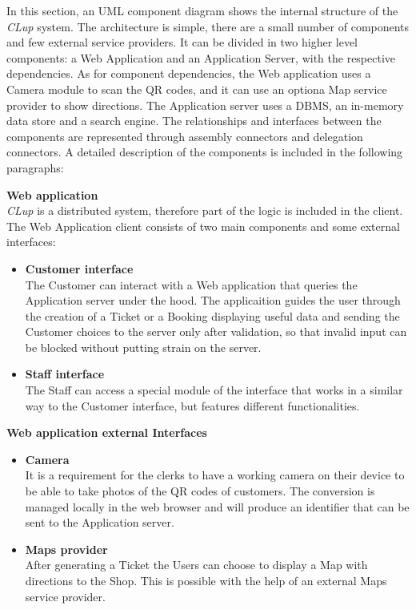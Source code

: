 In this section, an UML component diagram shows the internal structure of the \emph{CLup} system. The architecture is simple, there are a small number of components and few external service providers. It can be divided in two higher level components: a Web Application and an Application Server, with the respective dependencies.
As for component dependencies, the Web application uses a Camera module to scan the QR codes, and it can use an optiona Map service provider to show directions. The Application server uses a DBMS, an in-memory data store and a search engine.
The relationships and interfaces between the components are represented through assembly connectors and delegation connectors. 
A detailed description of the components is included in the following paragraphs:

\textbf{Web application}\\
\emph{CLup} is a distributed system, therefore part of the logic is included in the client. The Web Application client consists of two main components and some external interfaces:
\begin{itemize}
    \item \textbf{Customer interface}\\ The Customer can interact with a Web application that queries the Application server under the hood. The applicaition guides the user through the creation of a Ticket or a Booking displaying useful data and sending the Customer choices to the server only after validation, so that invalid input can be blocked without putting strain on the server.
    \item \textbf{Staff interface}\\ The Staff can access a special module of the interface that works in a similar way to the Customer interface, but features different functionalities. 
    
\end{itemize}
\textbf{Web application external Interfaces}
\begin{itemize}
    \item \textbf{Camera}\\ It is a requirement for the clerks to have a working camera on their device to be able to take photos of the QR codes of customers. The conversion is managed locally in the web browser and will produce an identifier that can be sent to the Application server. 
    \item \textbf{Maps provider}\\ After generating a Ticket the Users can choose to display a Map with directions to the Shop. This is possible with the help of an external Maps service provider.
\end{itemize}

